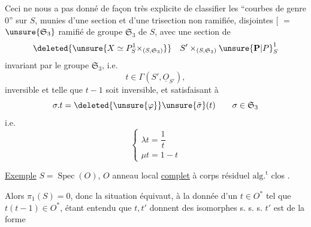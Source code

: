 
Ceci ne nous a pas donné de façon très explicite de classifier les ``courbes  de genre $0$'' sur $S$, munies d'une section et d'une trisection non ramifiée, disjointes
[ $=$  $\unsure{\mathfrak S_3}$  ramifié  de groupe $\mathfrak S_3$ de $S$, avec une section  de
\[
\deleted{\unsure{X\simeq P^1_S\times_{(S,\mathfrak S_3)}}}\quad S'\times_{(S,\mathfrak S_3)}\unsure{\mathbf P|P}^1_S
\]
 invariant par le groupe $\mathfrak S_3$, i.e. 
\[
t\in\Gamma(S',\underline O_{S'}),
\]
inversible et telle que $t-1$ soit inversible, et satisfaisant à
\[
\sigma.t=\deleted{\unsure{\varphi}}\unsure{\bar\sigma}(t)\qquad\sigma\in\mathfrak S_3
\]
i.e.
\[
\begin{cases}\lambda t=\dfrac1t\\\mu t=1-t\end{cases}
\]

\uline{Exemple} $S=\operatorname{Spec}(O)$, $O$ anneau local \uline{complet} à corps résiduel $\mathrm{alg.}^{\mathrm t}$ clos  .

Alors  $\pi_1(S)=0$, donc la situation équivaut,  à la donnée d'un $t\in O^*$ tel que  $t(t-1)\in O^*$, étant entendu que $t,t'$ donnent des  isomorphes  s. s. s. $t'$ est de la forme 

